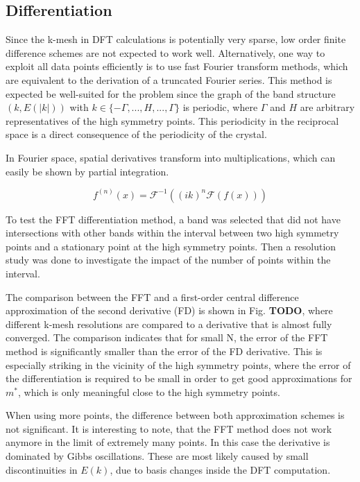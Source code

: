 \subsection{Differentiation}

Since the k-mesh in DFT calculations is potentially very sparse, low order finite difference schemes are not expected to work well. Alternatively, one way to exploit all data points efficiently is to use fast Fourier transform methods, which are equivalent to the derivation of a truncated Fourier series. This method is expected be well-suited for the problem since the graph of the band structure $(k, E(|k|))$ with $k \in \{-\Gamma,..., H,..., \Gamma\}$ is periodic, where $\Gamma$ and $H$ are arbitrary representatives of the high symmetry points. This periodicity in the reciprocal space is a direct consequence of the periodicity of the crystal.

In Fourier space, spatial derivatives transform into multiplications, which can easily be shown by partial integration.

\begin{equation}
    f^{(n)}(x) = \mathcal{F}^{-1}\left((ik)^n\mathcal{F}(f(x))\right)
\end{equation}
 
To test the FFT differentiation method, a band was selected that did not have intersections with other bands within the interval between two high symmetry points and a stationary point at the high symmetry points. Then a resolution study was done to investigate the impact of the number of points within the interval.

The comparison between the FFT and a first-order central difference approximation of the second derivative (FD) is shown in Fig. \textbf{TODO}, where different k-mesh resolutions are compared to a derivative that is almost fully converged. The comparison indicates that for small N, the error of the FFT method is significantly smaller than the error of the FD derivative. This is especially striking in the vicinity of the high symmetry points, where the error of the differentiation is required to be small in order to get good approximations for $m^{*}$, which is only meaningful close to the high symmetry points.

When using more points, the difference between both approximation schemes is not significant. It is interesting to note, that the FFT method does not work anymore in the limit of extremely many points. In this case the derivative is dominated by Gibbs oscillations. These are most likely caused by small discontinuities in $E(k)$, due to basis changes inside the DFT computation.

